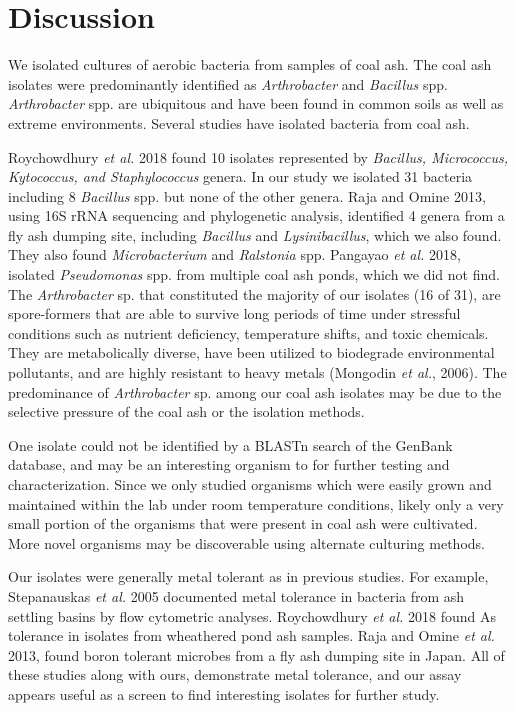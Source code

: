 \documentclass[ms, hidelinks]{uncgdissertationexp}
\theoremstyle{plain}
\theoremstyle{definition}
\theoremstyle{remark}
\begin{document}
\hypertarget{discussion-1}{%
\section{Discussion}\label{discussion-1}}
We isolated cultures of aerobic bacteria from samples of coal ash. The coal ash isolates were predominantly identified as \emph{Arthrobacter} and \emph{Bacillus} spp. \emph{Arthrobacter} spp. are ubiquitous and have been found in common soils as well as extreme environments. Several studies have isolated bacteria from coal ash. 

Roychowdhury \emph{et al.} 2018 found 10 isolates represented by \emph{Bacillus, Micrococcus, Kytococcus, and Staphylococcus} genera. In our study we isolated 31 bacteria including 8 \emph{Bacillus} spp. but none of the other genera.  Raja and Omine 2013, using 16S rRNA sequencing and phylogenetic analysis, identified 4 genera from a fly ash dumping site, including \emph{Bacillus} and \emph{Lysinibacillus}, which we also found. They also found \emph{Microbacterium} and \emph{Ralstonia} spp. Pangayao \emph{et al.} 2018, isolated \emph{Pseudomonas} spp. from multiple coal ash ponds, which we did not find. The \emph{Arthrobacter} sp. that constituted the majority of our isolates (16 of 31), are spore-formers that are able to survive long periods of time under stressful conditions such as nutrient deficiency, temperature shifts, and toxic chemicals. They are metabolically diverse, have been utilized to biodegrade environmental pollutants, and are highly resistant to heavy metals (Mongodin \emph{et al.}, 2006). The predominance of \emph{Arthrobacter} sp. among our coal ash isolates may be due to the selective pressure of the coal ash or the isolation methods. 

One isolate could not be identified by a BLASTn search of the GenBank database, and may be an interesting organism to for further testing and characterization. Since we only studied organisms which were easily grown and maintained within the lab under room temperature conditions, likely only a very small portion of the organisms that were present in coal ash  were cultivated. More novel organisms may be discoverable using alternate culturing methods. 

Our isolates were generally metal tolerant as in previous studies. For example, Stepanauskas \emph{et al.} 2005 documented metal tolerance in bacteria from ash settling basins by flow cytometric analyses. Roychowdhury \emph{et al.} 2018 found As tolerance in isolates from wheathered pond ash samples.  Raja and Omine \emph{et al.} 2013, found boron tolerant microbes from a fly ash dumping site in Japan. All of these studies along with ours, demonstrate metal tolerance, and our assay appears useful as a screen to find interesting isolates for further study.
\end{document}
